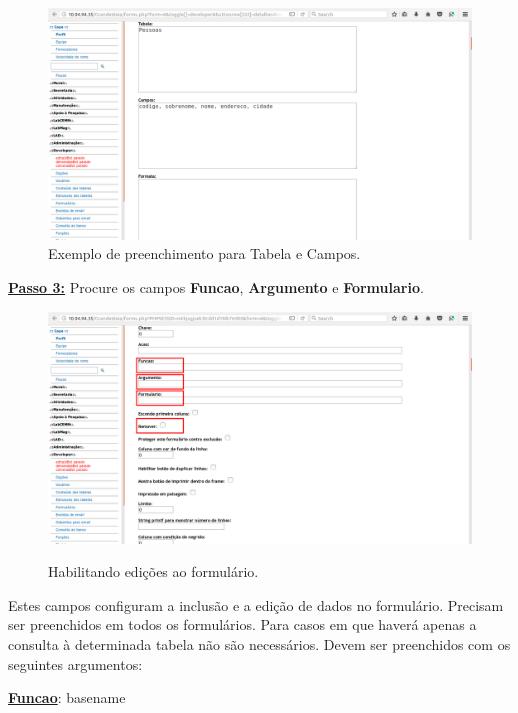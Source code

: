 \documentclass[9pt]{report}
\begin{document}
{      \begin{figure}[H]
        \includegraphics[width=\textwidth]{2_Formularios/2_Criacao_de_formularios/6.png}
        \caption{Exemplo de preenchimento para Tabela e Campos.}
        \label{fig:campotabela2}
      \end{figure}

      \underline{\textbf{Passo 3:}} Procure os campos
      \textbf{Funcao}, \textbf{Argumento} e \textbf{Formulario}.

      \begin{figure}[H]
        \includegraphics[width=\textwidth]{2_Formularios/2_Criacao_de_formularios/7.png}
        \label{fig:configform}
        \caption{Habilitando edições ao formulário.}
      \end{figure}

      Estes campos configuram a inclusão e a edição de dados no
      formulário. Precisam ser preenchidos em todos os formulários.
      Para casos em que haverá apenas a consulta à determinada tabela
      não são necessários. Devem ser preenchidos com os seguintes
      argumentos:
  
      \underline{\textbf{Funcao}}: basename

}
\end{document}
